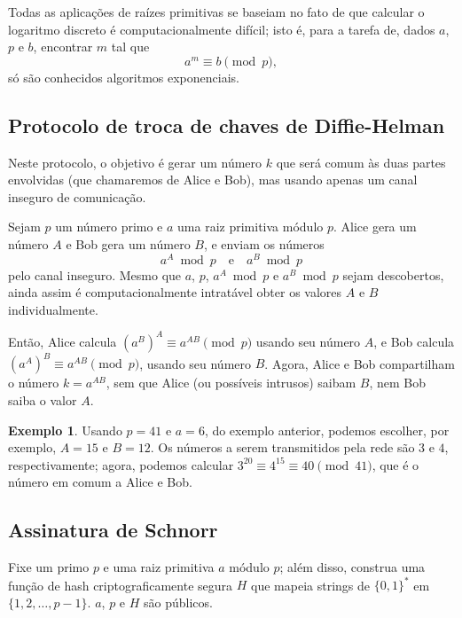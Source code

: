 \documentclass{article}
\theoremstyle{definition}
\newtheorem{example}{Exemplo}
\begin{document}
Todas as aplicações de raízes primitivas
se baseiam no fato de que calcular o logaritmo discreto
é computacionalmente difícil;
isto é, para a tarefa de,
dados $a$, $p$ e $b$,
encontrar $m$ tal que
\begin{equation*}
    a^m \equiv b \pmod p,
\end{equation*}
só são conhecidos algoritmos exponenciais.

\subsection{Protocolo de troca de chaves de Diffie-Helman}

Neste protocolo,
o objetivo é gerar um número $k$ que será comum às duas partes envolvidas
(que chamaremos de Alice e Bob),
mas usando apenas um canal inseguro de comunicação.

Sejam $p$ um número primo e $a$ uma raiz primitiva módulo $p$.
Alice gera um número $A$ e Bob gera um número $B$,
e enviam os números
\begin{equation*}
    a^A \bmod p \quad \text{e} \quad a^B \bmod p
\end{equation*}
pelo canal inseguro.
Mesmo que $a$, $p$, $a^A \bmod p$ e $a^B \bmod p$ sejam descobertos,
ainda assim é computacionalmente intratável
obter os valores $A$ e $B$ individualmente.

Então, Alice calcula $(a^B)^A \equiv a^{AB} \pmod p$
usando seu número $A$,
e Bob calcula $(a^A)^B \equiv a^{AB} \pmod p$,
usando seu número $B$.
Agora,
Alice e Bob compartilham o número $k = a^{AB}$,
sem que Alice (ou possíveis intrusos) saibam $B$,
nem Bob saiba o valor $A$.

\begin{example}
    Usando $p = 41$ e $a = 6$,
    do exemplo anterior,
    podemos escolher, por exemplo, $A = 15$ e $B = 12$.
    Os números a serem transmitidos pela rede
    são $3$ e $4$,
    respectivamente;
    agora,
    podemos calcular $3^{20} \equiv 4^{15} \equiv 40 \pmod{41}$,
    que é o número em comum a Alice e Bob.
\end{example}

\subsection{Assinatura de Schnorr}

Fixe um primo $p$ e uma raiz primitiva $a$ módulo $p$;
além disso, construa uma função de hash criptograficamente segura $H$
que mapeia strings de $\{0, 1\}^*$ em $\{1, 2, \ldots, p-1\}$.
$a$, $p$ e $H$ são públicos.
\end{document}
